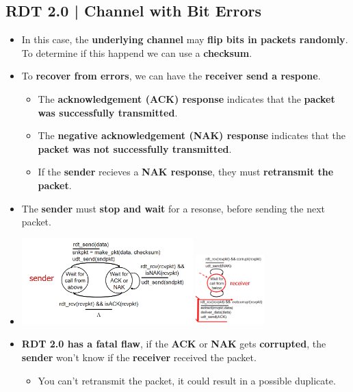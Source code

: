 \documentclass{article}
\begin{document}
    \subsection*{RDT 2.0 | Channel with Bit Errors}
    \begin{itemize}
        \item In this case, the \textbf{underlying channel} may \textbf{flip bits in packets randomly}. To determine if this happend we can use a \textbf{checksum}.
        \item To \textbf{recover from errors}, we can have the \textbf{receiver send a respone}.
        \begin{itemize}
            \item The \textbf{acknowledgement (ACK) response} indicates that the \textbf{packet was successfully transmitted}.
            \item The \textbf{negative acknowledgement (NAK) response} indicates that the \textbf{packet was not successfully transmitted}.
            \item If the \textbf{sender} recieves a \textbf{NAK response}, they must \textbf{retransmit the packet}.
        \end{itemize} 
        \item The \textbf{sender} must \textbf{stop and wait} for a resonse, before sending the next packet.
        \item[] \includegraphics*[width=250px]{images/RDT-2.0.PNG} \includegraphics*[width=100px]{images/RDT-2.0-1.PNG}
        \item \textbf{RDT 2.0 has a fatal flaw}, if the \textbf{ACK} or \textbf{NAK} gets \textbf{corrupted}, the \textbf{sender} won't know if the \textbf{receiver} received the packet.
        \begin{itemize}
            \item You can't retransmit the packet, it could result in a possible duplicate.
        \end{itemize} 
    \end{itemize}
\end{document}
